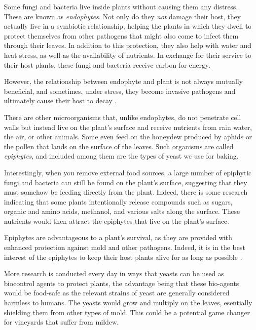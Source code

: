 Some fungi and bacteria live inside plants without causing them any distress.
These are known as {\it endophytes}. Not only do they \textit{not} damage their
host, they actually live in a symbiotic relationship, helping the plants in
which they dwell to protect themselves from other pathogens that might also
come to infect them through their leaves. In addition to this protection, they
also help with water and heat stress, as well as the availability of nutrients.
In exchange for their service to their host plants, these fungi and bacteria
receive carbon for energy.

However, the relationship between endophyte and plant is not always mutually
beneficial, and sometimes, under stress, they become invasive pathogens and
ultimately cause their host to decay \cite{endophytes+in+plants}.

There are other microorganisms that, unlike endophytes, do not penetrate cell
walls but instead live on the plant's surface and receive nutrients from rain
water, the air, or other animals. Some even feed on the honeydew produced by
aphids or the pollen that lands on the surface of the leaves. Such organisms
are called \textit{epiphytes}, and included among them are the types of yeast
we use for baking.

Interestingly, when you remove external food sources, a large number of
epiphytic fungi and bacteria can still be found on the plant's surface,
suggesting that they must somehow be feeding directly from the plant.
Indeed, there is some research indicating that some plants intentionally release
compounds such as sugars, organic and amino acids, methanol, and various
salts along the surface. These nutrients would then attract the epiphytes that
live on the plant's surface.

Epiphytes are advantageous to a plant's survival, as they are provided with
enhanced protection against mold and other pathogens. Indeed, it is in the
best interest of the epiphytes to keep their host plants alive for as long as
possible \cite{leaf+surface+sugars+epiphytes}.

More research is conducted every day in ways that yeasts can be used as
biocontrol agents to protect plants, the advantage being that these bio-agents
would be food-safe as the relevant strains of yeast are generally considered
harmless to humans. The yeasts would grow and multiply on the leaves,
esentially shielding them from other types of mold. This could be a potential
game changer for vineyards that suffer from mildew.

